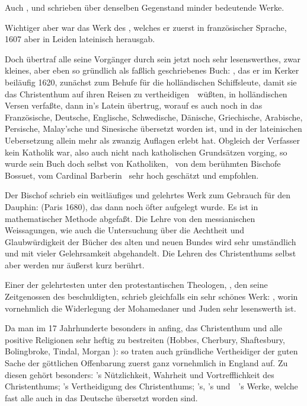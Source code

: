 \begin{aufza}
\begin{aufzb}
\item Auch , und  schrieben über denselben Gegenstand minder bedeutende Werke.
\item Wichtiger aber war das Werk des , welches er zuerst in französischer Sprache, 1607 aber in Leiden lateinisch herausgab.
\item Doch  übertraf alle seine Vorgänger durch sein jetzt noch sehr lesenswerthes, zwar kleines, aber eben so gründlich als faßlich geschriebenes Buch: , das er im Kerker beiläufig 1620, zunächst zum Behufe für die holländischen Schiffsleute, damit sie das Christenthum auf ihren Reisen zu vertheidigen~\ wüßten, in holländischen Versen verfaßte, dann in's Latein übertrug, worauf es auch noch in das Französische, Deutsche, Englische, Schwedische, Dänische, Griechische, Arabische, Persische, Malay'sche und Sinesische übersetzt worden ist, und in der lateinischen Uebersetzung allein mehr als zwanzig Auflagen erlebt hat. Obgleich der Verfasser kein Katholik war, also auch nicht nach katholischen Grundsätzen vorging, so wurde sein Buch doch selbst von Katholiken, \zB\ von dem berühmten Bischofe Bossuet, vom Cardinal Barberin \uA\ sehr hoch geschätzt und empfohlen.
\item Der Bischof  schrieb ein weitläufiges und gelehrtes Werk zum Gebrauch für den Dauphin:  (Paris 1680), das dann noch öfter aufgelegt wurde. Es ist in mathematischer Methode abgefaßt. Die Lehre von den messianischen Weissagungen, wie auch die Untersuchung über die Aechtheit und Glaubwürdigkeit der Bücher des alten und neuen Bundes wird sehr umständlich und mit vieler Gelehrsamkeit abgehandelt. Die Lehren des Christenthums selbst aber werden nur äußerst kurz berührt.
\item Einer der gelehrtesten unter den protestantischen Theologen, , den seine Zeitgenossen des  beschuldigten, schrieb gleichfalls ein sehr schönes Werk: , worin vornehmlich die Widerlegung der Mohamedaner und Juden sehr lesenswerth ist.
\item Da man im 17 Jahrhunderte besonders in  anfing, das Christenthum und alle positive Religionen sehr heftig zu bestreiten (Hobbes, Cherbury, Shaftesbury, Bolingbroke, Tindal, Morgan \uA ): so traten auch gründliche Vertheidiger der guten Sache der göttlichen Offenbarung zuerst ganz vornehmlich in England auf. Zu diesen gehört besonders: 's Nützlichkeit, Wahrheit und Vortrefflichkeit des Christenthums; 's Vertheidigung des Christenthums; 's, 's und~\ 's Werke, welche fast alle auch in das Deutsche übersetzt worden sind.

\end{aufzb}
\end{aufza}
